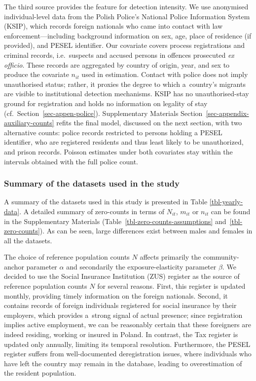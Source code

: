 The third source provides the feature for detection intensity. We use anonymised individual-level data from the Polish Police's National Police Information System (KSIP), which records foreign nationals who came into contact with law enforcement---including background information on sex, age, place of residence (if provided), and PESEL identifier. Our covariate covers process registrations and criminal records, i.e.\ suspects and accused persons in offences prosecuted \emph{ex officio}. These records are aggregated by country of origin, year, and sex to produce the covariate $n_{it}$ used in estimation. Contact with police does not imply unauthorised status; rather, it proxies the degree to which a~country's migrants are visible to institutional detection mechanisms. KSIP has no unauthorised-stay ground for registration and holds no information on legality of stay (cf.~Section~\ref{sec-appen-police}). Supplementary Materials Section~\ref{sec-appendix-auxiliary-counts} refits the final model, discussed on the next section, with two alternative counts: police records restricted to persons holding a PESEL identifier, who are registered residents and thus least likely to be unauthorized, and prison records. Poisson estimates under both covariates stay within the intervals obtained with the full police count.


\subsubsection{Summary of the datasets used in the study}\label{sec-datasets-summary}

A summary of the datasets used in this study is presented in Table
\ref{tbl-yearly-data}. A detailed summary of zero-counts in terms of $N_{it}$, $m_{it}$ or $n_{it}$ can be found in the Supplementary Materials (Table~\ref{tbl-zero-counts-assumptions} and~\ref{tbl-zero-counts}). As can be seen, large differences exist between males and females in all the datasets. 


The choice of reference population counts $N$ affects primarily the community-anchor parameter $\alpha$ and secondarily the exposure-elasticity parameter $\beta$. We decided to use the Social Insurance Institution (ZUS) register as the source of reference population counts $N$ for several reasons. First,
this register is updated monthly, providing timely information on the
foreign nationals. Second, it contains records of foreign individuals
registered for social insurance by their employers, which provides a~strong signal of actual presence; since registration implies active
employment, we can be reasonably certain that these foreigners are
indeed residing, working or insured in Poland. In contrast, the Tax
register is updated only annually, limiting its temporal resolution.
Furthermore, the PESEL register suffers from well-documented
deregistration issues, where individuals who have left the country may
remain in the database, leading to overestimation of the resident
population. 


